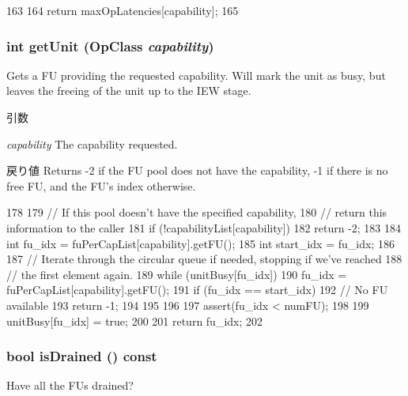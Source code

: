 \begin{DoxyCode}
163                                             {
164         return maxOpLatencies[capability];
165     }
\end{DoxyCode}
\hypertarget{classFUPool_afe4fb1c0e25607723658c1051ff3b0bf}{
\subsubsection[{getUnit}]{\setlength{\rightskip}{0pt plus 5cm}int getUnit (OpClass {\em capability})}}
\label{classFUPool_afe4fb1c0e25607723658c1051ff3b0bf}
Gets a FU providing the requested capability. Will mark the unit as busy, but leaves the freeing of the unit up to the IEW stage. 
\begin{DoxyParams}{引数}
\item[{\em capability}]The capability requested. \end{DoxyParams}
\begin{DoxyReturn}{戻り値}
Returns -\/2 if the FU pool does not have the capability, -\/1 if there is no free FU, and the FU's index otherwise. 
\end{DoxyReturn}



\begin{DoxyCode}
178 {
179     //  If this pool doesn't have the specified capability,
180     //  return this information to the caller
181     if (!capabilityList[capability])
182         return -2;
183 
184     int fu_idx = fuPerCapList[capability].getFU();
185     int start_idx = fu_idx;
186 
187     // Iterate through the circular queue if needed, stopping if we've reached
188     // the first element again.
189     while (unitBusy[fu_idx]) {
190         fu_idx = fuPerCapList[capability].getFU();
191         if (fu_idx == start_idx) {
192             // No FU available
193             return -1;
194         }
195     }
196 
197     assert(fu_idx < numFU);
198 
199     unitBusy[fu_idx] = true;
200 
201     return fu_idx;
202 }
\end{DoxyCode}
\hypertarget{classFUPool_adf5473c18a3d7c1e88c4a2072bce5526}{
\subsubsection[{isDrained}]{\setlength{\rightskip}{0pt plus 5cm}bool isDrained () const}}
\label{classFUPool_adf5473c18a3d7c1e88c4a2072bce5526}
Have all the FUs drained? 


